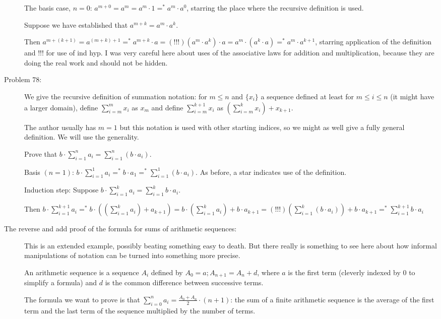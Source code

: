 \documentclass[12pt]{article}
\begin{document}
\begin{description}
The basis case, $n=0$:  $a^{m+0} = a^m = a^m\cdot 1 =^* a^m \cdot a^0$, starring the place where the recursive definition is used.

Suppose we have established that $a^{m+k} = a^m \cdot a^k$.

Then $a^{m+(k+1)} = a^{(m+k)+1} =^{*} a^{m+k}\cdot a =(!!!) (a^m\cdot a^k) \cdot a = a^m \cdot (a^k \cdot a) =^* a^m\cdot a^{k+1}$, starring application of the definition and !!! for use of ind hyp.  I was very careful here about uses of the associative laws for addition and multiplication, because they are doing the real work and should not be hidden.

\item[Problem 78:]  We give the recursive definition of summation notation:  for $m \leq n$ and $\{x_i\}$ a sequence defined at least for $m \leq i \leq n$ (it might have a larger domain), define $\sum_{i=m}^m x_i$ as $x_m$ and define
$\sum_{i=m}^{k+1}x_i$ as $(\sum_{i=m}^kx_i)+x_{k+1}$.

The author usually has $m=1$ but this notation is used with other starting indices, so we might as well give a fully general definition.  We will use the generality.

Prove that $b \cdot \sum_{i=1}^n a_i = \sum_{i=1}^n (b\cdot a_i)$.


Basis $(n=1)$:  $b \cdot \sum_{i=1}^1 a_i = ^* b \cdot a_1 =^* \sum_{i=1}^1 (b \cdot a_i)$.  As before, a star indicates use of the definition.

Induction step:  Suppose $b \cdot \sum_{i=1}^k a_i = \sum_{i=1}^k b \cdot a_i$.

Then $b \cdot \sum_{i=1}^{k+1}a_i =^* b\cdot ((\sum_{i=1}^ka_i)+a_{k+1}) = b\cdot(\sum_{i=1}^k a_i) + b \cdot a_{k+1} = (!!!) (\sum_{i=1}^k(b \cdot a_i))+b\cdot a_{k+1}=^* \sum_{i=1}^{k+1}b \cdot a_i$

\item[The reverse and add proof of the formula for sums of arithmetic sequences:]

This is an extended example, possibly beating something easy to death.  But there really is something to see here about how informal manipulations of notation can be turned into something more precise.

An arithmetic sequence is a sequence $A_i$ defined by $A_0 = a; A_{n+1} = A_n+d$, where $a$ is the first term
(cleverly indexed by 0 to simplify a formula) and $d$ is the common difference between successive terms.

The formula we want to prove is that $\sum_{i=0}^n a_i = \frac{A_0 + A_n}2\cdot (n+1)$:  the sum of a finite arithmetic sequence is the average of the first term and the last term of the sequence multiplied by the number of terms.


\end{description}
\end{document}
